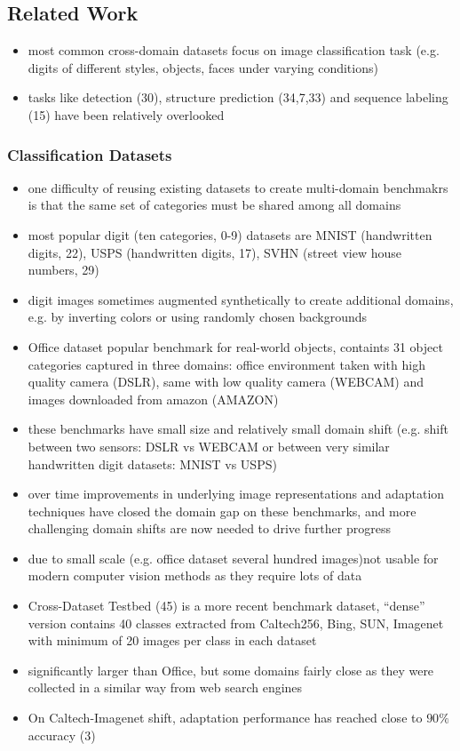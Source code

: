 \subsection{Related Work}
\begin{itemize}
	\item most common cross-domain datasets focus on image classification task (e.g. digits of different styles, objects, faces under varying conditions)
	\item tasks like detection (30), structure prediction (34,7,33) and sequence labeling (15) have been relatively overlooked
\end{itemize}

\subsubsection{Classification Datasets}
\begin{itemize}
	\item one difficulty of reusing existing datasets to create multi-domain benchmakrs is that the same set of categories must be shared among all domains
	\item most popular digit (ten categories, 0-9) datasets are MNIST (handwritten digits, 22), USPS (handwritten digits, 17), SVHN (street view house numbers, 29)
	\item digit images sometimes augmented synthetically to create additional domains, e.g. by inverting colors or using randomly chosen backgrounds
	\item Office dataset popular benchmark for real-world objects, containts 31 object categories captured in three domains: office environment taken with high quality camera (DSLR), same with low quality camera (WEBCAM) and images downloaded from amazon (AMAZON)
	\item these benchmarks have small size and relatively small domain shift (e.g. shift between two sensors: DSLR vs WEBCAM or between very similar handwritten digit datasets: MNIST vs USPS)
	\item over time improvements in underlying image representations and adaptation techniques have closed the domain gap on these benchmarks, and more challenging domain shifts are now needed to drive further progress
	\item due to small scale (e.g. office dataset several hundred images)not usable for modern computer vision methods as they require lots of data
	\item Cross-Dataset Testbed (45) is a more recent benchmark dataset, ``dense'' version contains 40 classes extracted from Caltech256, Bing, SUN, Imagenet with minimum of 20 images per class in each dataset
	\item significantly larger than Office, but some domains fairly close as they were collected in a similar way from web search engines
	\item On Caltech-Imagenet shift, adaptation performance has reached close to $90\%$ accuracy (3)
\end{itemize}

